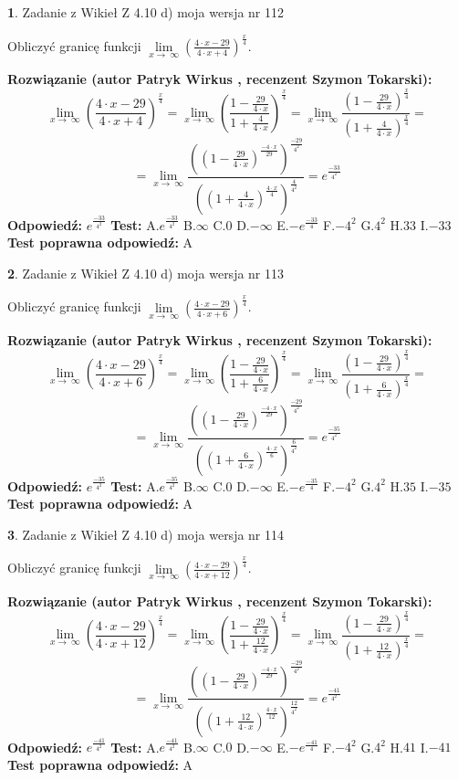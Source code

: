 \documentclass[12pt, a4paper]{article}
\theoremstyle{definition} %
\newtheorem{zad}{}
\newcommand{\zadStart}[1]{\begin{zad}#1\newline}
\newcommand{\zadStop}{\end{zad}}
\newcommand{\rozwStart}[2]{\noindent \textbf{Rozwiązanie (autor #1 , recenzent #2): }\newline}
\newcommand{\rozwStop}{\newline}
\newcommand{\odpStart}{\noindent \textbf{Odpowiedź:}\newline}
\newcommand{\odpStop}{\newline}
\newcommand{\testStart}{\noindent \textbf{Test:}\newline}
\newcommand{\testStop}{\newline}
\newcommand{\kluczStart}{\noindent \textbf{Test poprawna odpowiedź:}\newline}
\newcommand{\kluczStop}{\newline}
\begin{document}
\zadStart{Zadanie z Wikieł Z 4.10 d) moja wersja nr 112}


Obliczyć granicę funkcji  $\lim\limits_{x\to\ \infty}(\frac{4\cdot x-29}{4\cdot x+4})^{\frac{x}{4}}$.
\zadStop
\rozwStart{Patryk Wirkus}{Szymon Tokarski}
$$\lim\limits_{x\to\ \infty}(\frac{4\cdot x-29}{4\cdot x+4})^{\frac{x}{4}} = \lim\limits_{x\to\ \infty}(\frac{1-\frac{29}{4\cdot x}}{1+\frac{4}{4\cdot x}})^{\frac{x}{4}}=\lim\limits_{x\to\ \infty}\frac{(1-\frac{29}{4\cdot x})^{\frac{x}{4}}}{(1+\frac{4}{4\cdot x})^{\frac{x}{4}}}=$$
$$=\lim\limits_{x\to\ \infty}\frac{((1-\frac{29}{4\cdot x})^{\frac{-4\cdot x}{29}})^{\frac{-29}{4^{2}}}}{((1+\frac{4}{4\cdot x})^{\frac{4\cdot x}{4}})^{\frac{4}{4^{2}}}}=e^{\frac{-33}{4^{2}}}$$
\rozwStop
\odpStart
$e^{\frac{-33}{4^{2}}}$
\odpStop
\testStart
A.$e^{\frac{-33}{4^{2}}}$ B.$\infty$ C.$0$ D.$-\infty$ E.$-e^{\frac{-33}{4}}$
F.$-4^{2}$ G.$4^{2}$
H.$33$
I.$-33$
\testStop
\kluczStart
A
\kluczStop



\zadStart{Zadanie z Wikieł Z 4.10 d) moja wersja nr 113}


Obliczyć granicę funkcji  $\lim\limits_{x\to\ \infty}(\frac{4\cdot x-29}{4\cdot x+6})^{\frac{x}{4}}$.
\zadStop
\rozwStart{Patryk Wirkus}{Szymon Tokarski}
$$\lim\limits_{x\to\ \infty}(\frac{4\cdot x-29}{4\cdot x+6})^{\frac{x}{4}} = \lim\limits_{x\to\ \infty}(\frac{1-\frac{29}{4\cdot x}}{1+\frac{6}{4\cdot x}})^{\frac{x}{4}}=\lim\limits_{x\to\ \infty}\frac{(1-\frac{29}{4\cdot x})^{\frac{x}{4}}}{(1+\frac{6}{4\cdot x})^{\frac{x}{4}}}=$$
$$=\lim\limits_{x\to\ \infty}\frac{((1-\frac{29}{4\cdot x})^{\frac{-4\cdot x}{29}})^{\frac{-29}{4^{2}}}}{((1+\frac{6}{4\cdot x})^{\frac{4\cdot x}{6}})^{\frac{6}{4^{2}}}}=e^{\frac{-35}{4^{2}}}$$
\rozwStop
\odpStart
$e^{\frac{-35}{4^{2}}}$
\odpStop
\testStart
A.$e^{\frac{-35}{4^{2}}}$ B.$\infty$ C.$0$ D.$-\infty$ E.$-e^{\frac{-35}{4}}$
F.$-4^{2}$ G.$4^{2}$
H.$35$
I.$-35$
\testStop
\kluczStart
A
\kluczStop



\zadStart{Zadanie z Wikieł Z 4.10 d) moja wersja nr 114}


Obliczyć granicę funkcji  $\lim\limits_{x\to\ \infty}(\frac{4\cdot x-29}{4\cdot x+12})^{\frac{x}{4}}$.
\zadStop
\rozwStart{Patryk Wirkus}{Szymon Tokarski}
$$\lim\limits_{x\to\ \infty}(\frac{4\cdot x-29}{4\cdot x+12})^{\frac{x}{4}} = \lim\limits_{x\to\ \infty}(\frac{1-\frac{29}{4\cdot x}}{1+\frac{12}{4\cdot x}})^{\frac{x}{4}}=\lim\limits_{x\to\ \infty}\frac{(1-\frac{29}{4\cdot x})^{\frac{x}{4}}}{(1+\frac{12}{4\cdot x})^{\frac{x}{4}}}=$$
$$=\lim\limits_{x\to\ \infty}\frac{((1-\frac{29}{4\cdot x})^{\frac{-4\cdot x}{29}})^{\frac{-29}{4^{2}}}}{((1+\frac{12}{4\cdot x})^{\frac{4\cdot x}{12}})^{\frac{12}{4^{2}}}}=e^{\frac{-41}{4^{2}}}$$
\rozwStop
\odpStart
$e^{\frac{-41}{4^{2}}}$
\odpStop
\testStart
A.$e^{\frac{-41}{4^{2}}}$ B.$\infty$ C.$0$ D.$-\infty$ E.$-e^{\frac{-41}{4}}$
F.$-4^{2}$ G.$4^{2}$
H.$41$
I.$-41$
\testStop
\kluczStart
A
\kluczStop
\end{document}
